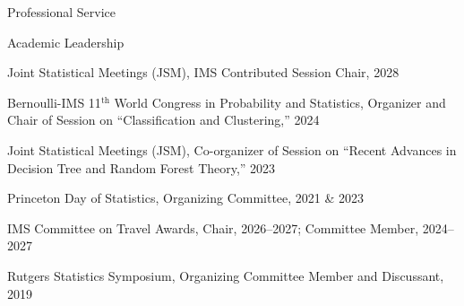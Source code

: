 \documentclass{resume}
\begin{document}

\begin{rSection}{Professional Service}

\begin{rSubsection}{Academic Leadership}{}{}{}
\item {Joint Statistical Meetings (JSM), IMS Contributed Session Chair, 2028}
\item {Bernoulli-IMS 11$^{\text{th}}$ World Congress in Probability and Statistics, Organizer and Chair of Session on ``Classification and Clustering,'' 2024}
\item {Joint Statistical Meetings (JSM), Co-organizer of Session on ``Recent Advances in Decision Tree and Random Forest Theory,'' 2023}
\item {Princeton Day of Statistics, Organizing Committee, 2021 \& 2023}
\item {IMS Committee on Travel Awards, Chair, 2026--2027; Committee Member, 2024--2027}
\item {Rutgers Statistics Symposium, Organizing Committee Member and Discussant, 2019}
\end{rSubsection}



\end{rSection}
\end{document}

